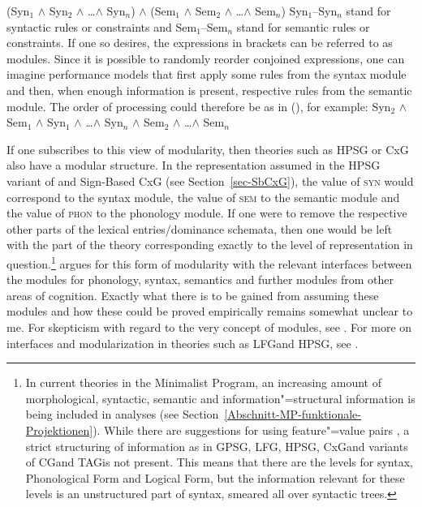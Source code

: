 \ea
(Syn$_1$ $\wedge$ Syn$_2$ $\wedge$ \ldots $\wedge$ Syn$_n$) $\wedge$ (Sem$_1$ $\wedge$ Sem$_2$ $\wedge$ \ldots $\wedge$ Sem$_n$)
\z
Syn$_1$--Syn$_n$ stand for syntactic rules or constraints and Sem$_1$--Sem$_n$ stand for semantic rules or constraints.
If one so desires, the expressions in brackets can be referred to as modules. Since it is possible
to randomly reorder conjoined expressions, one can imagine performance models that first apply some
rules from the syntax module and then, when enough information is present, respective rules from the
semantic module. The order of processing could therefore be as in (), for example: 
\ea
Syn$_2$ $\wedge$ Sem$_1$ $\wedge$ Syn$_1$ $\wedge$ \ldots $\wedge$ Syn$_n$ $\wedge$ Sem$_2$ $\wedge$ \ldots $\wedge$ Sem$_n$
\z

\noindent
If one subscribes to this view of modularity, then theories such as HPSG or CxG also have a modular structure.
In the representation assumed in the HPSG variant of \citet{ps} and Sign-Based CxG (see Section~\ref{sec-SbCxG}),
the value of \textsc{syn} would correspond to the syntax module, the value of \textsc{sem} to the semantic module and the value of \textsc{phon}  to the phonology module. If one were to
remove the respective other parts of the lexical entries/dominance schemata, then one would
 be left with the part of the theory corresponding exactly to the level of representation in question.\footnote{%
  In current theories in the Minimalist Program, an increasing amount of morphological, syntactic, semantic and 
  information"=structural information is being included in analyses (see Section~\ref{Abschnitt-MP-funktionale-Projektionen}).
  While there are suggestions for using feature"=value pairs \citep[--291]{SE2002a}, a strict structuring of information
  as in GPSG\indexgpsg, LFG\indexlfg, HPSG\indexhpsg, CxG\indexcxg and variants of
  CG\indexcg and TAG\indextag is not present. This means that there are the levels for syntax, Phonological Form and Logical Form,
  but the information relevant for these levels is an unstructured part of syntax, smeared all over
  syntactic trees.
} 
  argues for this form of modularity with the relevant interfaces between the modules for phonology, syntax, semantics and further modules from other areas of cognition. 
Exactly what there is to be gained from assuming these modules and how these could be proved empirically remains somewhat unclear to me. For skepticism with regard to the very concept of modules, see
. For more on interfaces and modularization in theories such as LFG\indexlfg and HPSG\indexhpsg, see .

